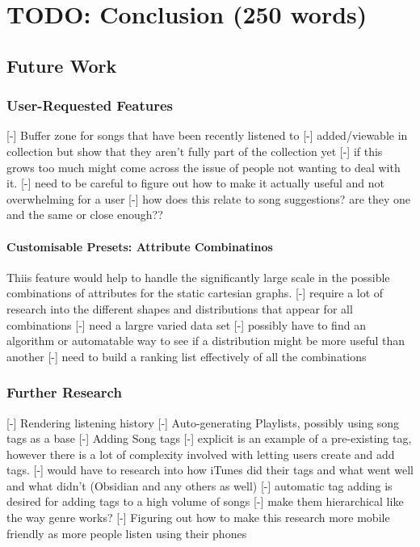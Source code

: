 \chapter{TODO: Conclusion (250 words)}%


\section{Future Work}
\subsection{User-Requested Features}
[-] Buffer zone for songs that have been recently listened to
    [-] added/viewable in collection but show that they aren't fully part of the collection yet
    [-] if this grows too much might come across the issue of people not wanting to deal with it.
    [-] need to be careful to figure out how to make it actually useful and not overwhelming for a user
    [-] how does this relate to song suggestions? are they one and the same or close enough??

\subsubsection{Customisable Presets: Attribute Combinatinos}
Thiis feature would help to handle the significantly large scale in the possible combinations of attributes for the static cartesian graphs.
    [-] require a lot of research into the different shapes and distributions that appear for all combinations
    [-] need a largre varied data set
    [-] possibly have to find an algorithm or automatable way to see if a distribution might be more useful than another
    [-] need to build a ranking list effectively of all the combinations

\subsection{Further Research}
[-] Rendering listening history
[-] Auto-generating Playlists, possibly using song tags as a base
[-] Adding Song tags
    [-] explicit is an example of a pre-existing tag, however there is a lot of complexity involved with letting users create and add tags.
    [-] would have to research into how iTunes did their tags and what went well and what didn't (Obsidian and any others as well)
    [-] automatic tag adding is desired for adding tags to a high volume of songs
    [-] make them hierarchical like the way genre works?
[-] Figuring out how to make this research more mobile friendly as more people listen using their phones\cite{} %